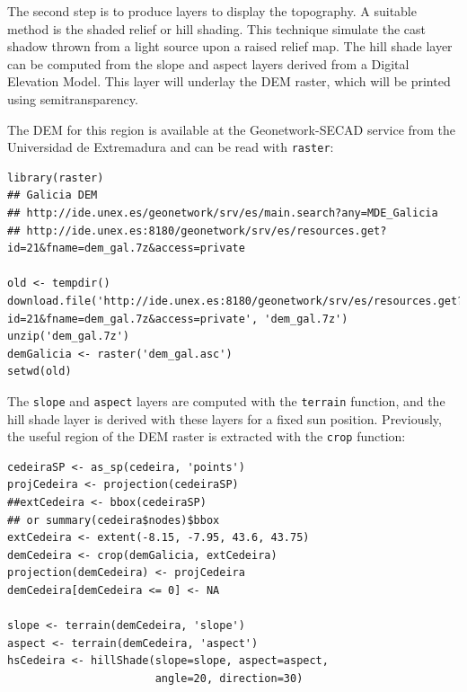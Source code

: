 
The second step is to produce layers to display the topography. A
suitable method is the shaded relief or hill shading. This
technique simulate the cast shadow thrown from a light source upon
a raised relief map. The hill shade layer can be computed from the
slope and aspect layers derived from a Digital Elevation
Model. This layer will underlay the DEM raster, which will be printed
using semitransparency.  

The DEM for this region is available at
the Geonetwork-SECAD service from the Universidad de Extremadura
and can be read with \texttt{raster}:


\lstset{language=R}
\begin{lstlisting}
library(raster)
## Galicia DEM
## http://ide.unex.es/geonetwork/srv/es/main.search?any=MDE_Galicia
## http://ide.unex.es:8180/geonetwork/srv/es/resources.get?id=21&fname=dem_gal.7z&access=private

old <- tempdir()
download.file('http://ide.unex.es:8180/geonetwork/srv/es/resources.get?id=21&fname=dem_gal.7z&access=private', 'dem_gal.7z')
unzip('dem_gal.7z')
demGalicia <- raster('dem_gal.asc')
setwd(old)
\end{lstlisting}



The \texttt{slope} and \texttt{aspect} layers are computed with the \texttt{terrain}
function, and the hill shade layer is derived with these layers
for a fixed sun position. Previously, the useful region of the DEM
raster is extracted with the \texttt{crop} function:


\lstset{language=R}
\begin{lstlisting}
cedeiraSP <- as_sp(cedeira, 'points')
projCedeira <- projection(cedeiraSP)
##extCedeira <- bbox(cedeiraSP) 
## or summary(cedeira$nodes)$bbox
extCedeira <- extent(-8.15, -7.95, 43.6, 43.75)
demCedeira <- crop(demGalicia, extCedeira)
projection(demCedeira) <- projCedeira
demCedeira[demCedeira <= 0] <- NA

slope <- terrain(demCedeira, 'slope')
aspect <- terrain(demCedeira, 'aspect')
hsCedeira <- hillShade(slope=slope, aspect=aspect,
                       angle=20, direction=30)
\end{lstlisting}

